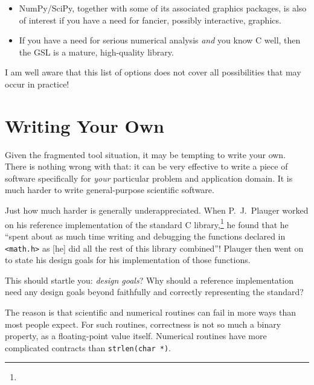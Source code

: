 \begin{itemize}
\item NumPy/SciPy, together with some of its associated graphics
  packages, is also of interest if you have a need for fancier,
  possibly interactive, graphics.

\item If you have a need for serious numerical analysis \emph{and}
  you know C well, then the GSL is a mature, high-quality library.
\end{itemize}

I am well aware that this list of options does not cover all
possibilities that may occur in practice!

\section{Writing Your Own}

 
Given the fragmented tool situation, it may be tempting to write
your own. There is nothing wrong with that: it can be very
effective to write a piece of software specifically for \emph{your}
particular problem and application domain. It is much harder to write
general-purpose scientific software.

Just how much harder is generally underappreciated. When P.\ J.\
Plauger worked on his reference implementation of the standard C
library,\footnote{} he found that he ``spent about as
much time writing and debugging the functions declared in
\texttt{<math.h>} as [he] did all the rest of this library combined''!
Plauger then went on to state his design goals for his implementation
of those functions.

This should startle you: \emph{design goals}? Why
should a reference implementation need any design goals beyond
faithfully and correctly representing the standard?

The reason is that scientific and numerical routines can fail in more
ways than most people expect. For such routines, correctness is not so
much a binary property, as a floating-point value itself. Numerical
routines have more complicated contracts than \texttt{strlen(char *)}.

